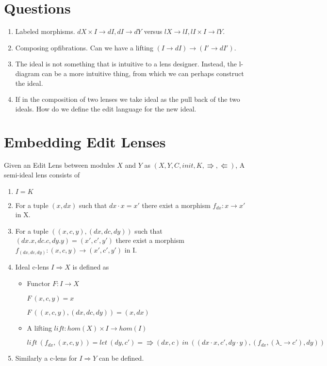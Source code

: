 \documentclass[a4paper,10pt]{article}
\begin{document}
\section{Questions}
\begin{enumerate}
 \item Labeled morphisms. $dX \times I \to dI, dI \to dY$ versus $lX \to lI, lI \times I \to lY$.
 \item Composing opfibrations. Can we have a lifting $(I \to dI) \to (I' \to dI')$.
 \item The ideal is not something that is intuitive to a lens designer. Instead, the l-diagram can be a more intuitive thing, from which we can perhaps construct the ideal.
 \item If in the composition of two lenses we take ideal as the pull back of the two ideals. How do we define the edit language for the new ideal.
\end{enumerate}

\section{Embedding Edit Lenses}
Given an Edit Lens between modules $X$ and $Y$ as $(X,Y,C,init,K,\Rrightarrow,\Lleftarrow)$, A semi-ideal lens consists of
\begin{enumerate}
\item $I = K$
\item For a tuple $(x,dx)$ such that $dx \cdot x=x'$ there
  exist a morphism $f_{dx}: x \to x'$ in X. 
\item For a tuple $((x,c,y),(dx,dc,dy))$ such
  that $(dx.x,dc.c,dy.y)=(x',c',y')$ there exist a morphism $f_{(dx,dc,dy)}:
  (x,c,y) \to (x',c',y')$ in I.
\item Ideal c-lens $I \Rightarrow X$ is defined as 

\begin {itemize}
\item Functor $F: I \to X$ 

$F~(x,c,y) = x$ 

$F~((x,c,y),(dx,dc,dy))=(x,dx)$ 
\item A lifting $lift: hom(X) \times I \to hom(I)$ 
      
$lift~(f_{dx},(x,c,y))=let~(dy,c')=\Rrightarrow(dx,c)~in~((dx \cdot x, c', dy \cdot y), (f_{dx},(\lambda
  \_ \to c'),dy))$
\end{itemize}
\item Similarly a c-lens for $I \Rightarrow Y$ can be defined.
\end{enumerate}
\end{document}
